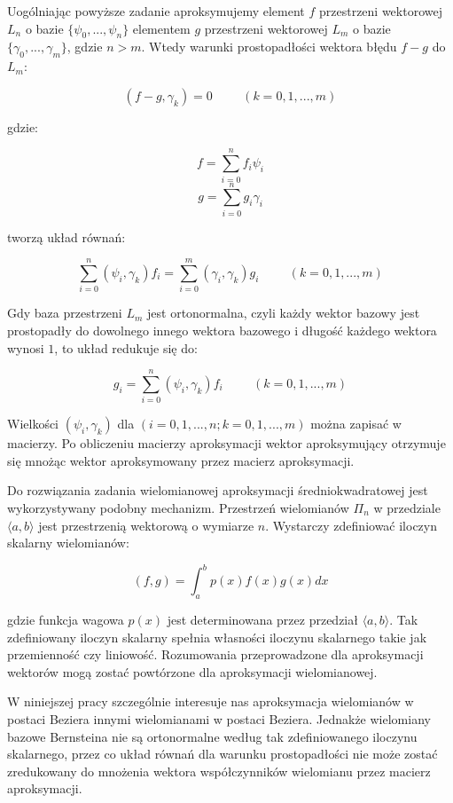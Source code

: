 \documentclass{article}
\begin{document}
Uogólniając powyższe zadanie aproksymujemy element $f$ przestrzeni wektorowej $L_n$ o bazie $\{\psi_0, ..., \psi_n\}$ elementem $g$ przestrzeni wektorowej $L_m$ o bazie $\{\gamma_0, ..., \gamma_m\}$, gdzie $n > m$. Wtedy warunki prostopadłości wektora błędu $f - g$ do $L_m$:

$$(f - g, \gamma_k) = 0\hspace{1cm}(k=0,1,...,m)$$

gdzie:

$$f = \sum^n_{i=0}f_i\psi_i$$
$$g = \sum^n_{i=0}g_i\gamma_i$$

tworzą układ równań:

$$\sum^n_{i=0}(\psi_i, \gamma_k)f_i = \sum^m_{i=0}(\gamma_i, \gamma_k)g_i\hspace{1cm}(k=0,1,...,m)$$

Gdy baza przestrzeni $L_m$ jest ortonormalna, czyli każdy wektor bazowy jest prostopadły do dowolnego innego wektora bazowego i długość każdego wektora wynosi $1$, to układ redukuje się do:

$$g_i = \sum^n_{i=0}(\psi_i, \gamma_k)f_i\hspace{1cm}(k=0,1,...,m)$$

Wielkości $(\psi_i, \gamma_k)$ dla $(i=0,1,...,n;k=0,1,...,m)$ można zapisać w macierzy. Po obliczeniu macierzy aproksymacji wektor aproksymujący otrzymuje się mnożąc wektor aproksymowany przez macierz aproksymacji.

Do rozwiązania zadania wielomianowej aproksymacji średniokwadratowej jest wykorzystywany podobny mechanizm. Przestrzeń wielomianów $\Pi_n$ w przedziale $\langle a, b \rangle$ jest przestrzenią wektorową o wymiarze $n$. Wystarczy zdefiniować iloczyn skalarny wielomianów:

$$(f, g) = \int_a^bp(x)f(x)g(x)dx$$

gdzie funkcja wagowa $p(x)$ jest determinowana przez przedział $\langle a, b \rangle$. Tak zdefiniowany iloczyn skalarny spełnia własności iloczynu skalarnego takie jak przemienność czy liniowość. Rozumowania przeprowadzone dla aproksymacji wektorów mogą zostać powtórzone dla aproksymacji wielomianowej.

W niniejszej pracy szczególnie interesuje nas aproksymacja wielomianów w postaci Beziera innymi wielomianami w postaci Beziera. Jednakże wielomiany bazowe Bernsteina nie są ortonormalne według tak zdefiniowanego iloczynu skalarnego, przez co układ równań dla warunku prostopadłości nie może zostać zredukowany do mnożenia wektora współczynników wielomianu przez macierz aproksymacji.
\end{document}
